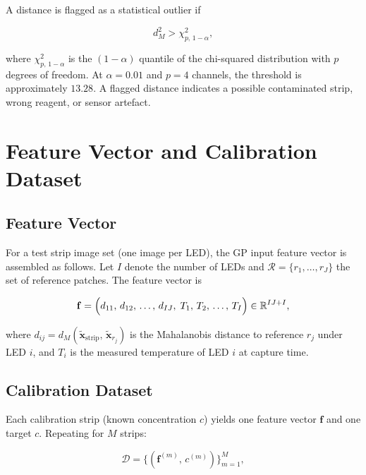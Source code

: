 \documentclass[11pt, a4paper]{article}
\newcommand{\R}{\mathbb{R}}
\newcommand{\bx}{\mathbf{x}}
\begin{document}
A distance is flagged as a statistical outlier if

\begin{equation}
  d_M^2 > \chi^2_{p,\,1-\alpha},
  \label{eq:chi2-flag}
\end{equation}

where $\chi^2_{p,\,1-\alpha}$ is the $(1-\alpha)$ quantile of the
chi-squared distribution with $p$ degrees of freedom.  At $\alpha = 0.01$
and $p = 4$ channels, the threshold is approximately $13.28$.
A flagged distance indicates a possible contaminated strip, wrong
reagent, or sensor artefact.

\section{Feature Vector and Calibration Dataset}

\subsection{Feature Vector}

For a test strip image set (one image per LED), the GP input feature
vector is assembled as follows.  Let $I$ denote the number of LEDs
and $\mathcal{R} = \{r_1, \ldots, r_J\}$ the set of reference patches.
The feature vector is

\begin{equation}
  \mathbf{f}
    = \Bigl(
        d_{11},\, d_{12},\, \ldots,\, d_{IJ},\;
        T_1,\, T_2,\, \ldots,\, T_I
      \Bigr)
    \in \R^{IJ + I},
  \label{eq:feature-vector}
\end{equation}

where $d_{ij} = d_M(\tilde{\bx}_{\mathrm{strip}},\, \tilde{\bx}_{r_j})$
is the Mahalanobis distance to reference $r_j$ under LED $i$, and
$T_i$ is the measured temperature of LED $i$ at capture time.

\subsection{Calibration Dataset}

Each calibration strip (known concentration $c$) yields one feature
vector $\mathbf{f}$ and one target $c$.  Repeating for $M$ strips:

\begin{equation}
  \mathcal{D}
    = \bigl\{(\mathbf{f}^{(m)},\, c^{(m)})\bigr\}_{m=1}^{M},
  \label{eq:cal-dataset}
\end{equation}
\end{document}
